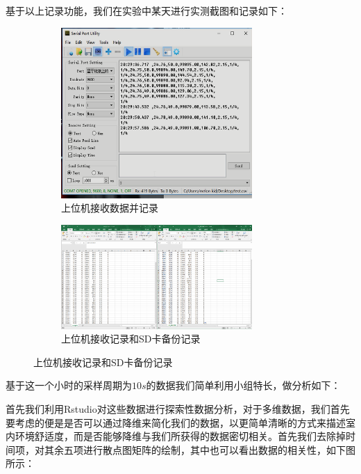 \documentclass[a4paper, 11pt]{article} %
\begin{document}
基于以上记录功能，我们在实验中某天进行实测截图和记录如下：

\begin{figure}[H]
  \centering
  \begin{minipage}[H]{0.48\textwidth}
    \begin{figure}[H]
      \centering
      \includegraphics[width = 0.8\textwidth]{upmachine.png}
      \caption{上位机接收数据并记录}
    \end{figure}
  \end{minipage}
  \begin{minipage}[H]{0.48\textwidth}
    \begin{figure}[H]
      \centering
      \includegraphics[width = 0.8\textwidth]{upmachine_sd.png}
      \caption{上位机接收记录和SD卡备份记录}
    \end{figure}
  \end{minipage}
\end{figure}

基于这一个小时的采样周期为$10s$的数据我们简单利用小组特长，做分析如下：

首先我们利用Rstudio对这些数据进行探索性数据分析，对于多维数据，我们首先要考虑的便是是否可以通过降维来简化我们的数据，以更简单清晰的方式来描述室内环境舒适度，而是否能够降维与我们所获得的数据密切相关。首先我们去除掉时间项，对其余五项进行散点图矩阵的绘制，其中也可以看出数据的相关性，如下图所示：
\end{document}
